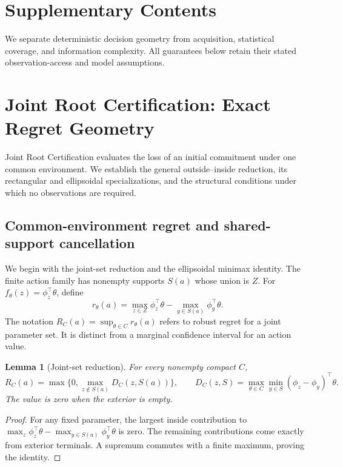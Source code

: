 \documentclass{article}
\theoremstyle{plain}
\newtheorem{lemma}[theorem]{Lemma}
\theoremstyle{definition}
\begin{document}
\section*{Supplementary Contents}
\supplementarycontents

\clearpage
{}
{}
\par\medskip
We separate deterministic decision geometry from acquisition, statistical coverage, and information complexity. All guarantees below retain their stated observation-access and model assumptions.

\section{Joint Root Certification: Exact Regret Geometry}
\label{app:group-cert}

Joint Root Certification evaluates the loss of an initial commitment under one common environment. We establish the general outside--inside reduction, its rectangular and ellipsoidal specializations, and the structural conditions under which no observations are required.

\subsection{Common-environment regret and shared-support cancellation}
\label{app:common-environment}\label{sec:bay-supp}

We begin with the joint-set reduction and the ellipsoidal minimax identity.  The finite action family has nonempty supports $S(a)$ whose
union is $Z$.  For $f_\theta(z)=\phi_z^\top\theta$, define
\[
 r_\theta(a)=\max_{z\in Z}\phi_z^\top\theta
              -\max_{y\in S(a)}\phi_y^\top\theta.
\]
The notation $R_C(a)=\sup_{\theta\in C}r_\theta(a)$ refers to robust
regret for a joint parameter set.  It is distinct from a marginal
confidence interval for an action value.

\begin{lemma}[Joint-set reduction]
\label{lem:bay-reduction}
For every nonempty compact $C$,
\[
 R_C(a)=\max\{0,\max_{z\notin S(a)}D_C(z,S(a))\},\qquad
 D_C(z,S)=\max_{\theta\in C}
       \min_{y\in S}(\phi_z-\phi_y)^\top\theta.
\]
The value is zero when the exterior is empty.
\end{lemma}
\begin{proof}
For any fixed parameter, the largest inside contribution to
$\max_z\phi_z^\top\theta-\max_{y\in S(a)}\phi_y^\top\theta$ is zero.
The remaining contributions come exactly from exterior terminals.
A supremum commutes with a finite maximum, proving the identity.
\end{proof}
\end{document}
